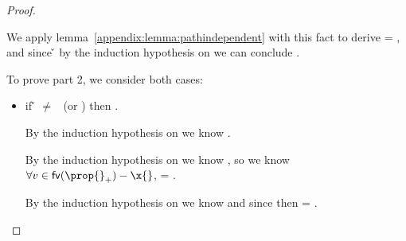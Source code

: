 \begin{lemma}
\begin{proof}
\begin{case}[T-App]
\begin{itemize}
\begin{subcase}[B-BetaClosure]
\begin{itemize}
             We apply lemma~\ref{appendix:lemma:pathindependent} with this fact
             to derive
                          { {\y{}}}
                          = 
             ,
                      and since
                      { {\y{}}}{\v{}}
                      by the induction hypothesis on 
                      we can conclude 
                      .
         \end{itemize}


         To prove part 2, we consider both cases:
         \begin{itemize}
           \item if \v{} $\not=$ \false\ (or \nil) then \satisfies{\openv{}}{\thenprop{\prop{}}}.

                              By the induction hypothesis on 
                              we know
                        {}.

                        By the induction hypothesis on {}
                        we know
,
so we know $\forall v \in \fv{\thenprop{\prop{}}} - \x{}$,
                              {} = {}.

                              By the induction hypothesis on  we know {}
                              and since {}
                              then 
                             = .


\end{itemize}
\end{subcase}
\end{itemize}
\end{case}
\end{proof}
\end{lemma}
